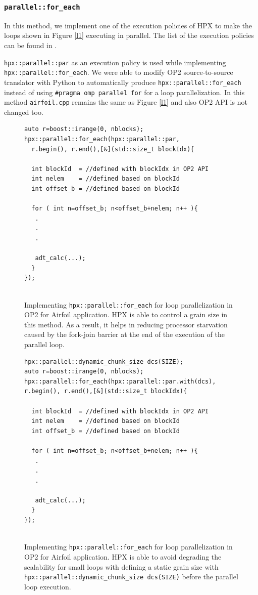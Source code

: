 \documentclass[conference]{IEEEtran}
\begin{document}
\subsubsection{\textbf{\texttt{parallel::for\_each}}}
\label{sec:for}

In this method, we implement one of the execution policies of HPX to make the loops shown in Figure \ref{l1} executing in parallel. The list of the execution policies can be found in \cite{hpx_v0.9.11}. 

\texttt{hpx::parallel::par} as an execution policy is used while implementing \texttt{hpx::parallel::for\_each}. We were able to modify OP2 source-to-source translator with Python to automatically produce \texttt{hpx::parallel::for\_each} instead of using \texttt{\#pragma omp parallel for} for a loop parallelization. In this method \texttt{airfoil.cpp} remains the same as Figure \ref{l1} and also OP2 API is not changed too.

\begin{figure} 
    \begin{lstlisting}    
auto r=boost::irange(0, nblocks);
hpx::parallel::for_each(hpx::parallel::par,
  r.begin(), r.end(),[&](std::size_t blockIdx){
  
  int blockId  = //defined with blockIdx in OP2 API
  int nelem    = //defined based on blockId 
  int offset_b = //defined based on blockId
        
  for ( int n=offset_b; n<offset_b+nelem; n++ ){
   .
   .
   .

   adt_calc(...);
  }
});
  
    \end{lstlisting}
    \caption{\small{Implementing \texttt{hpx::parallel::for\_each} for loop parallelization in OP2 for Airfoil application. HPX is able to control a grain size in this method. As a result, it helps in reducing processor starvation caused by the fork-join barrier at the end of the execution of the parallel loop.}}
    \label{l3}
\end{figure}

\begin{figure} 
    \begin{lstlisting}    
hpx::parallel::dynamic_chunk_size dcs(SIZE);
auto r=boost::irange(0, nblocks);
hpx::parallel::for_each(hpx::parallel::par.with(dcs), r.begin(), r.end(),[&](std::size_t blockIdx){
  
  int blockId  = //defined with blockIdx in OP2 API
  int nelem    = //defined based on blockId 
  int offset_b = //defined based on blockId
        
  for ( int n=offset_b; n<offset_b+nelem; n++ ){
   .
   .
   .

   adt_calc(...);
  }
});
  
    \end{lstlisting}
    \caption{\small{Implementing \texttt{hpx::parallel::for\_each} for loop parallelization in OP2 for Airfoil application. HPX is able to avoid degrading the scalability for small loops with defining a static grain size with \texttt{hpx::parallel::dynamic\_chunk\_size dcs(SIZE)} before the parallel loop execution.}}
    \label{l3b}
\end{figure}
\end{document}
